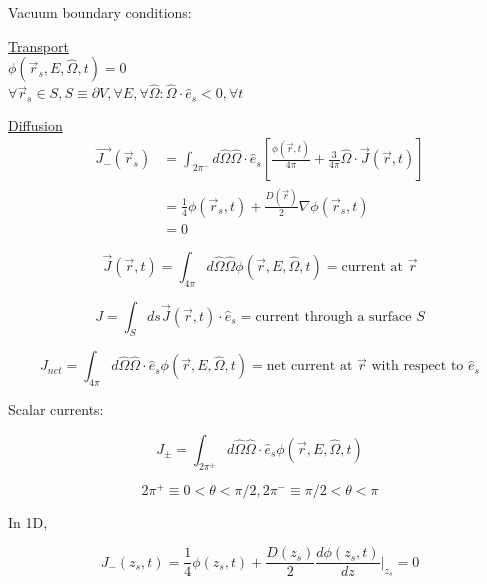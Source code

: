 \documentclass[12pt]{article}
\newcommand{\rvec}{\ensuremath{\vec{r}}}
\newcommand{\omvec}{\ensuremath{\hat{\Omega}}}
\begin{document}
Vacuum boundary conditions:

\begin{minipage}[t]{0.5\textwidth}
\underline{Transport} \\
$\phi(\rvec_s,E,\omvec,t) = 0$ \\
$\forall\rvec_s \in S, S \equiv \partial V, \forall E, \forall \omvec: \omvec\cdot\hat{e}_s<0, \forall t$
\end{minipage}
\begin{minipage}[t]{0.5\textwidth}
\underline{Diffusion} \\
\vspace{-10 mm}
\begin{align*}
\vec{J_-}(\rvec_s) &= \int_{2\pi^-}d\omvec\omvec\cdot\hat{e}_s
\left[\frac{\phi(\rvec,t)}{4\pi} + \frac{3}{4\pi}\omvec\cdot\vec{J}(\rvec,t)\right] \\
&= \frac{1}{4}\phi(\rvec_s,t) + \frac{D(\rvec)}{2}\nabla\phi(\rvec_s,t) \\
&= 0
\end{align*}
\end{minipage}

\begin{equation*}
\vec{J}(\rvec,t) = \int_{4\pi}d\omvec\omvec\phi(\rvec,E,\omvec,t) = \text{current at $\rvec$}
\end{equation*}

\begin{equation*}
J = \int_Sds\vec{J}(\rvec,t)\cdot\hat{e}_s = \text{current through a surface $S$}
\end{equation*}

\begin{equation*}
J_{net} = \int_{4\pi}d\omvec\omvec\cdot\hat{e}_s\phi(\rvec,E,\omvec,t) 
= \text{net current at $\rvec$ with respect to $\hat{e}_s$}
\end{equation*}

Scalar currents:

\begin{equation*}
J_{\pm} = \int_{2\pi^{\pm}}d\omvec\omvec\cdot\hat{e}_s\phi(\rvec,E,\omvec,t)
\end{equation*}

\begin{equation*}
2\pi^+ \equiv 0 < \theta < \pi/2, 2\pi^- \equiv \pi/2 < \theta < \pi
\end{equation*}

In 1D,

\begin{equation*}
J_-(z_s,t) = \frac{1}{4}\phi(z_s,t) + \frac{D(z_s)}{2}\frac{d\phi(z_s,t)}{dz}\Bigr|_{z_s} = 0
\end{equation*}
\end{document}
